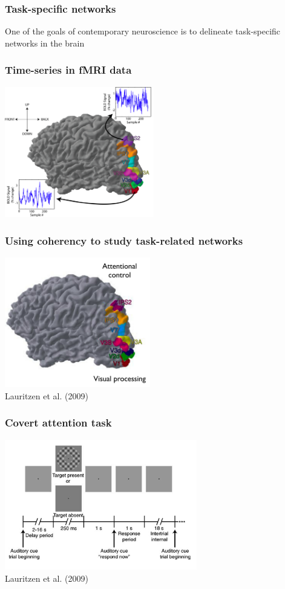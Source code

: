 \documentclass{beamer}
\begin{document}
\begin{frame}
\frametitle{Task-specific networks}
  One of the goals of contemporary neuroscience is to delineate task-specific
  networks in the brain
\end{frame}

\begin{frame}
\frametitle{Time-series in fMRI data}
\includegraphics[height=5.7cm]{figures/brain_w_tseries}
\end{frame}

\begin{frame}
\frametitle{Using coherency to study task-related networks}
\includegraphics[height=5.7cm]{figures/lauritzen1}
\\
\hfill 
Lauritzen et al. (2009)
\end{frame}

\begin{frame}
\frametitle{Covert attention task}
\includegraphics[height=5.7cm]{figures/lauritzen2}
\\
\hfill 
Lauritzen et al. (2009)
\end{frame}
\end{document}
